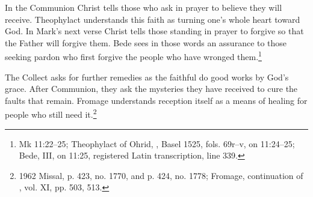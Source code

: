 In the Communion Christ tells those who ask in prayer to believe they will
receive. Theophylact understands this faith as turning one's whole heart
toward God. In Mark's next verse Christ tells those standing in prayer to
forgive so that the Father will forgive them. Bede sees in those words an
assurance to those seeking pardon who first forgive the people who have
wronged them.\footnote{Mk 11:22--25;
Theophylact of Ohrid, , Basel 1525, fols. 69r--v, on
11:24--25; Bede,  III, on 11:25,
registered Latin transcription, line 339.}

The Collect asks for further remedies as the faithful do good works by
God's grace. After Communion, they ask the mysteries they have received to
cure the faults that remain. Fromage understands reception itself as a means
of healing for people who still need it.\footnote{1962
Missal, p. 423, no. 1770, and p. 424, no. 1778; Fromage, continuation of
, vol. XI, pp. 503, 513.}
\clearpage
